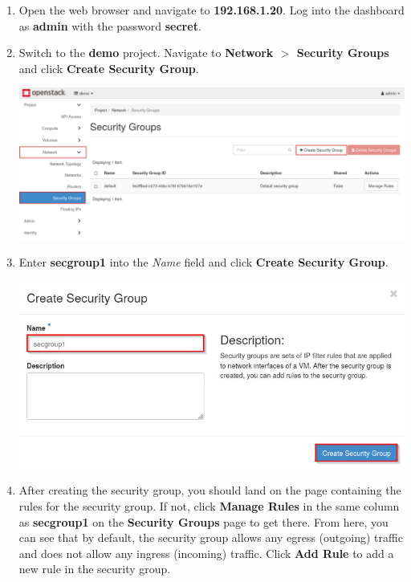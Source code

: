 \documentclass[letterpaper, 12pt]{article}
\begin{document}
\begin{enumerate}
    \item Open the web browser and navigate to \textbf{192.168.1.20}. Log into the dashboard as \textbf{admin} with the
    password \textbf{secret}.

    \item Switch to the \textbf{demo} project. Navigate to \textbf{Network $>$ Security Groups} and click
    \textbf{Create Security Group}.

    \begin{center}
        \includegraphics[width=\linewidth]{images/part5/step2.png}
    \end{center}

    \item Enter \textbf{secgroup1} into the \textit{Name} field and click \textbf{Create Security Group}.

    \begin{center}
        \includegraphics[width=\linewidth]{images/part5/step3.png}
    \end{center}

    \item After creating the security group, you should land on the page containing the rules for the security group.
    If not, click \textbf{Manage Rules} in the same column as \textbf{secgroup1} on the \textbf{Security Groups} page to
    get there. From here, you can see that by default, the security group allows any egress (outgoing) traffic and does
    not allow any ingress (incoming) traffic. Click \textbf{Add Rule} to add a new rule in the security group.


\end{enumerate}
\end{document}
